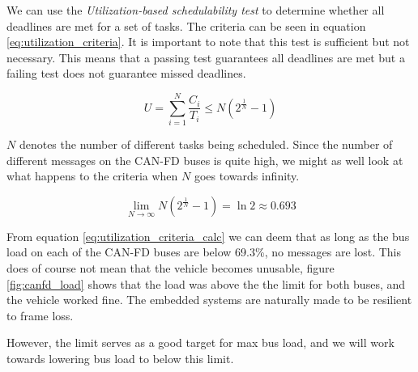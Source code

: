 We can use the \emph{Utilization-based schedulability test} to determine whether all deadlines are met for a set of tasks. The criteria can be seen in equation \ref{eq:utilization_criteria}. It is important to note that this test is sufficient but not necessary. This means that a passing test guarantees all deadlines are met but a failing test does not guarantee missed  deadlines.

\begin{equation}
    U=\sum_{i=1}^N\frac{C_i}{T_i}\leq N\left(2^\frac{1}{N}-1\right)
    \label{eq:utilization_criteria}
\end{equation}

$N$ denotes the number of different tasks being scheduled. Since the number of different messages on the CAN-FD buses is quite high, we might as well look at what happens to the criteria when $N$ goes towards infinity.

\begin{equation}
    \lim_{N\rightarrow\infty} N\left(2^\frac{1}{N}-1\right)=\ln{2}\approx 0.693
    \label{eq:utilization_criteria_calc}
\end{equation}

From equation \ref{eq:utilization_criteria_calc} we can deem that as long as the bus load on each of the CAN-FD buses are below 69.3\%, no messages are lost. This does of course not mean that the vehicle becomes unusable, figure \ref{fig:canfd_load} shows that the load was above the the limit for both buses, and the vehicle worked fine. The embedded systems are naturally made to be resilient to frame loss.

However, the limit serves as a good target for max bus load, and we will work towards lowering bus load to below this limit.





